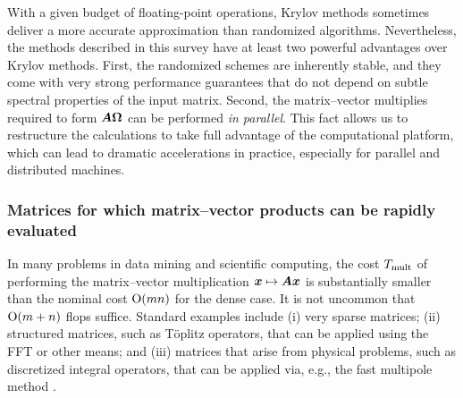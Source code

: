 \documentclass{article}
\begin{document}
With a given budget of floating-point operations, Krylov methods
sometimes deliver a more accurate approximation than randomized
algorithms.  Nevertheless, the methods described in this survey have at least
two powerful advantages over Krylov methods.  First, the randomized schemes
are inherently stable, and they come with very strong performance guarantees
that do not depend on %
subtle spectral properties of the input matrix.  Second, the matrix--vector multiplies
required to form $\bm{A\Omega}$ can be performed \emph{in parallel}.  This
fact allows us to restructure the calculations to take full advantage of the
computational platform, which can lead to dramatic accelerations in practice,
especially for parallel and distributed machines.



\subsubsection{Matrices for which matrix--vector products can be rapidly evaluated}
\label{sec:fastmatvec}

In many problems in data mining and scientific computing, the cost
$T_{\rm mult}$ of performing the matrix--vector multiplication
$\bm{x} \mapsto \bm{A}\bm{x}$ is substantially smaller
than the nominal cost $\mathrm{O}(mn)$ for the dense case.
It is not uncommon that $\mathrm{O}(m + n)$ flops suffice.
Standard examples include (i) very sparse matrices;
(ii) structured matrices, such as T{\"o}plitz operators, that can be applied
using the FFT or other means; and
(iii) matrices that arise from physical problems, such as
discretized integral operators, that can be applied via, e.g.,
the fast multipole method \cite{rokhlin1997}.
\end{document}
